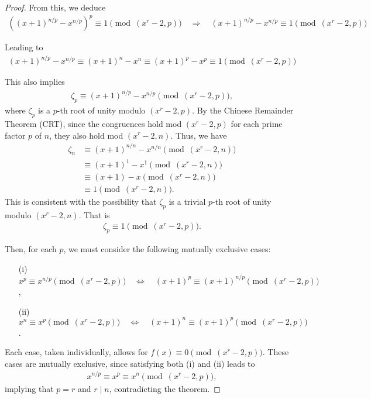 \documentclass{article}
\theoremstyle{plain}
\theoremstyle{definition}
\begin{document}
\begin{proof}
From this, we deduce
\begin{align*}
\left( (x+1)^{n/p} - x^{n/p} \right)^p \equiv 1 \pmod{(x^r-2, p)}
\quad\Longrightarrow\quad
(x+1)^{n/p} - x^{n/p} \equiv 1 \pmod{(x^r-2, p)}
\end{align*}

Leading to
\begin{align*}
(x+1)^{n/p} - x^{n/p} \equiv (x+1)^n - x^n \equiv (x+1)^p - x^p \equiv 1 \pmod{(x^r-2, p)}
\end{align*}

This also implies
\begin{align*}
    \zeta_p \equiv (x+1)^{n/p} - x^{n/p} \pmod{(x^r-2, p)} ,
\end{align*}
where $\zeta_p$ is a $p$-th root of unity modulo $(x^r-2, p)$. By the Chinese Remainder Theorem (CRT), since the congruences hold mod $(x^r-2, p)$ for each prime factor $p$ of $n$, they also hold mod $(x^r-2, n)$. Thus, we have
\begin{align*}
\zeta_n &\equiv (x+1)^{n/n} - x^{n/n} \pmod{(x^r-2, n)} \\
&\equiv (x+1)^1 - x^1 \pmod{(x^r-2, n)} \\
&\equiv (x+1) - x \pmod{(x^r-2, n)} \\
&\equiv 1 \pmod{(x^r-2, n)} .
\end{align*}
This is consistent with the possibility that $\zeta_p$ is a trivial $p$-th root of unity modulo $(x^r-2, n)$. That is
\begin{align*}
\zeta_p \equiv 1 \pmod{(x^r-2, p)} .
\end{align*}

Then, for each $p$, we must consider the following mutually exclusive cases:
\begin{enumerate}
\item[(i)] $x^p \equiv x^{n/p} \pmod{(x^r-2, p)} \quad\Longleftrightarrow\quad (x+1)^p \equiv (x+1)^{n/p} \pmod{(x^r-2, p)}$,
\item[(ii)] $x^n \equiv x^p \pmod{(x^r-2, p)} \quad\Longleftrightarrow\quad (x+1)^n \equiv (x+1)^p \pmod{(x^r-2, p)}$.
\end{enumerate}
Each case, taken individually, allows for $f(x) \equiv 0 \pmod{(x^r-2,p)}$. These cases are mutually exclusive, since satisfying both (i) and (ii) leads to
\begin{align*}
    x^{n/p} \equiv x^p \equiv x^n \pmod{(x^r-2, p)} ,
\end{align*}
implying that $p=r$ and $r \mid n$, contradicting the theorem.


\end{proof}
\end{document}
